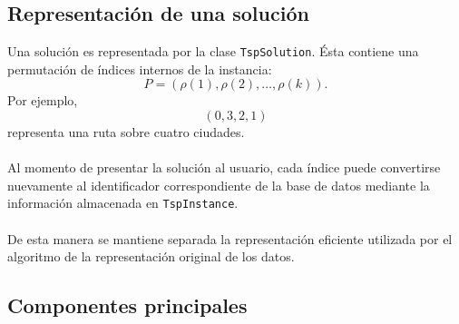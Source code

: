 \documentclass[12pt]{article}
\begin{document}
\subsection{Representación de una solución}

Una solución es representada por la clase \texttt{TspSolution}. Ésta
contiene una permutación de índices internos de la instancia:
\[
    P=
    \left(
        \rho(1),\rho(2),\ldots,\rho(k)
    \right).
\]
Por ejemplo,
\[
    (0,3,2,1)
\]
representa una ruta sobre cuatro ciudades.
\\\\
Al momento de presentar la solución al usuario, cada índice puede
convertirse nuevamente al identificador correspondiente de la base de datos
mediante la información almacenada en \texttt{TspInstance}.
\\\\
De esta manera se mantiene separada la representación eficiente utilizada
por el algoritmo de la representación original de los datos.

\subsection{Componentes principales}
\end{document}
